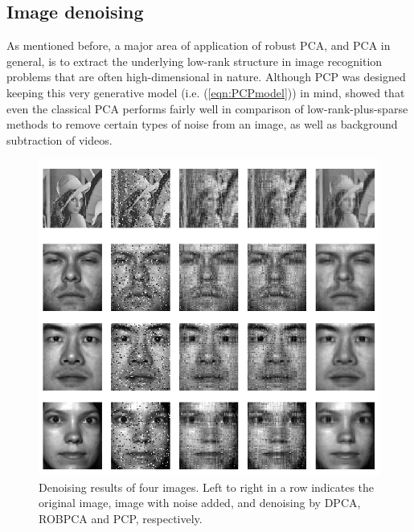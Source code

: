 \subsection*{\sffamily \large Image denoising}
As mentioned before, a major area of application of robust PCA, and PCA in general, is to extract the underlying low-rank structure in image recognition problems that are often high-dimensional in nature. Although PCP was designed keeping this very generative model (i.e. (\ref{eqn:PCPmodel})) in mind, \cite{ZhaoEtal14} showed that even the classical PCA performs fairly well in comparison of low-rank-plus-sparse methods to remove certain types of noise from an image, as well as background subtraction of videos.

\begin{figure}[t]
\centering
\includegraphics[width=.8\textwidth]{all_denoise}
\caption{Denoising results of four images. Left to right in a row indicates the original image, image with noise added, and denoising by DPCA, ROBPCA and PCP, respectively.}
\label{fig:figDenoise}
\end{figure}

